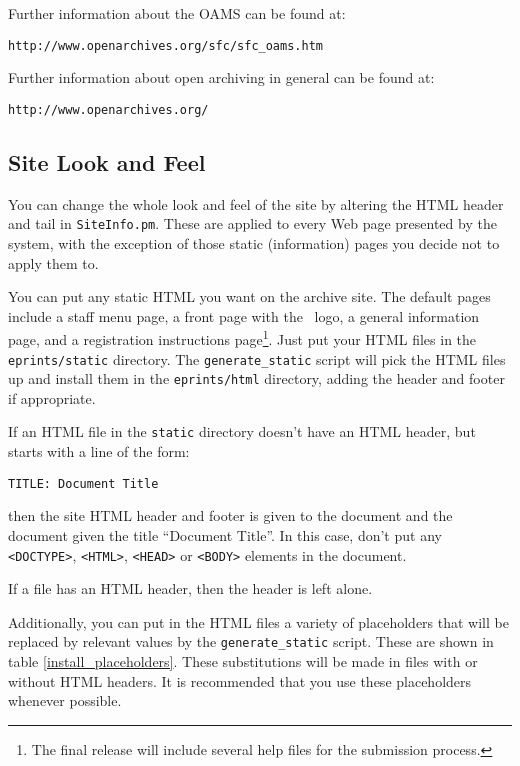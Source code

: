 Further information about the OAMS can be found at:

\begin{verbatim}
http://www.openarchives.org/sfc/sfc_oams.htm
\end{verbatim}

Further information about open archiving in general can be found at:

\begin{verbatim}
http://www.openarchives.org/
\end{verbatim}


\subsection{Site Look and Feel}

You can change the whole look and feel of the site by altering the HTML header and tail in {\tt SiteInfo.pm}. These are applied to every Web page presented by the system, with the exception of those static (information) pages you decide not to apply them to.

You can put any static HTML you want on the archive site. The default pages include a staff menu page, a front page with the \eprints\ logo, a general information page, and a registration instructions page\footnote{The final release will include several help files for the submission process.}. Just put your HTML files in the {\tt eprints/static} directory. The {\tt generate\_static} script will pick the HTML files up and install them in the {\tt eprints/html} directory, adding the header and footer if appropriate.

If an HTML file in the {\tt static} directory doesn't have an HTML header, but starts with a line of the form:

\begin{verbatim}
TITLE: Document Title
\end{verbatim}

then the site HTML header and footer is given to the document and the document given the title ``Document Title''. In this case, don't put any {\tt <DOCTYPE>}, {\tt <HTML>}, {\tt <HEAD>} or {\tt <BODY>} elements in the document.

If a file has an HTML header, then the header is left alone.

Additionally, you can put in the HTML files a variety of placeholders that will be replaced by relevant values by the {\tt generate\_static} script. These are shown in table \ref{install_placeholders}. These substitutions will be made in files with or without HTML headers. It is recommended that you use these placeholders whenever possible.

